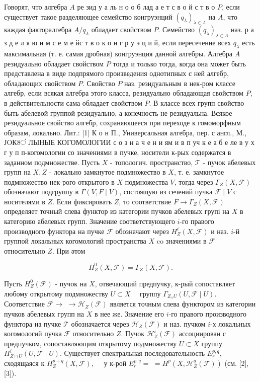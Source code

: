 \documentclass[10pt]{article}
\begin{document}
Говорят, что алгебра $A$ ре зид у а ль н о о б лад а е т с в о й с т в о $P$, если существует такое разделяющее семейство конгруэнций $\left(q_{\lambda}\right)_{\lambda \in \Lambda}$ на $A$, что каждая факторалгебра $A / q_{\lambda}$ обладает свойством $P$. Семеӥство $\left(q_{\lambda}\right)_{\lambda \in \Lambda}$ наз. р а з д е л я ю и м с е м е йс т в о к о н г р у э ц и й, если пересечение всех $q_{\lambda}$ есть максимальная (т. е. самая дробная) конгруэнция данной алгебры. Алгебра $A$ резидуально обладает свойством $P$ тогда и только тогда, когда она может быть представлена в виде подпрямого произведения однотипных с ней алгебр, обладающих свойством $P$. Свойство $P$ наз. резидуальным в нек-ром классе алгебр, если всякая алгебра этого класса, резидуально обладающая свойством $P$, в действительности сама обладает свойством $P$. В классе всех групп свойство быть абелевой группой резидуально, а конечность не резидуальна. Всякое резидуальное свойство алгебр, сохраняющееся при переходе к гомоморфным образам, локально. Лит.: [1] К о н П., Универсальная алгебра, пер. с англ., М., ЈOК8ं ЛЫНЫЕ КОГОМОЛОГИИ с о з н а ч е н и ям и в п уч к е а б е ле в у х г у п п-когомологии со значениями в пучке, носители к-рых содержатся в заданном подмножестве. Пусть $X$ - топологич. пространство, $\mathscr{T}$ - пучок абелевых групп на $X, Z$ - локально замкнутое подмножество в $X$, т. е. замкнутое подмножество нек-рого открытого в $X$ подмножества $V$, тогда через $\Gamma_{Z}(X, \mathscr{F})$ обозначают подгруппу в $\Gamma(V, F \mid V)$, состоящую из сечений пучка $\mathscr{F} \mid V$ с носителями в $Z$. Если фиксировать $Z$, то соответствие $F \rightarrow \Gamma_{Z}(X, \mathscr{F})$ определяет точный слева функтор из категории пучков абелевых групі на $X$ в категорию абелевых групп. Значение соответствующего $i$-го правого производного функтора на пучке $\mathscr{F}$ обозначают через $H_{Z}^{i}(X, \mathscr{F})$ и наз. $i$-й группой локальных когомологий пространства $X$ co значениями в $\mathscr{F}$ относительно $Z$. При әтом



\[

H_{Z}^{0}(X, \mathscr{F})=\Gamma_{Z}(X, \mathscr{F}) .

\]



Пусть $H_{Z}^{0}(\mathscr{F})$ - пучок на $X$, отвечающий предпучку, к-рый сопоставляет любому открытому подмножеству $U \subset X \quad$ группу $\Gamma_{Z_{\cap} U}(U, \mathscr{F} \mid U)$. Соответствие $\mathscr{F} \rightarrow$ $\rightarrow \mathscr{H}_{Z}(\mathscr{F})$ является точным слева функтором из категории пучков абелевых групп на $X$ в нее же. Значение его $i$-го правого производного функтора на пучке $\mathscr{T}$ обозначается через $\mathscr{H}_{Z}(\mathscr{F})$ и наз. пучком $i$-х локальных когомологий пучка $\mathscr{F}$ относительно $Z$. Пучок $\mathscr{H}_{Z}^{i}(\mathscr{F})$ ассоциирован с предпучком, сопоставляющим открытому подмножеству $U \subset X$ группу $H_{Z \cap U}^{i}(U, \mathscr{F} \mid U)$. Существует спектральная последовательность $E_{r}^{p, q}$, сходящаяся к $H_{Z}^{p+q}(X, \mathscr{F}), \quad$ у к-рой $E_{r}^{p, q}=$ $=H^{p}\left(X, \mathscr{H}_{Z}^{q}(\mathscr{F})\right)$ (см. [2], [3]).
\end{document}
